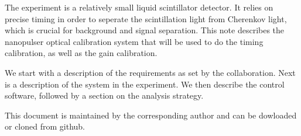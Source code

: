 

The \jsns experiment\cite{JSNS2TDR} is a relatively small liquid scintillator detector. It relies on precise timing in order to seperate the scintillation light from Cherenkov light, which is crucial for background and signal separation. This note describes the  nanopulser optical calibration system that will be used to do the timing calibration, as well as the gain calibration.

We start with a description of the requirements as set by the \jsns collaboration. Next is a description of the system in the experiment. We then describe the control software, followed by a section on the analysis strategy.

This document is maintained by the corresponding author and can be dowloaded or cloned from github\cite{GITHUB_DOC}.

